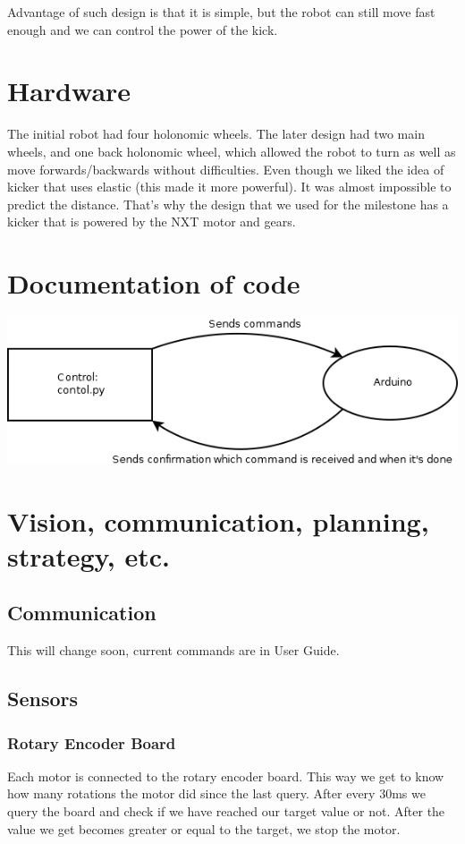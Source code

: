 \documentclass[12pt]{article}
\begin{document}
	Advantage of such design is that it is simple, but the robot can still move fast enough and we can control the power of the kick. 
 
  \section{Hardware}  
  \bigskip
  
  The initial robot had four holonomic wheels. The later design had two main wheels, and one back holonomic wheel, which allowed the robot to turn as well as move forwards/backwards without difficulties. 
	Even though we liked the idea of kicker that uses elastic (this made it more powerful). It was almost impossible to predict the distance. That's why the design that we used for the milestone has a kicker that is powered by the NXT motor and gears.
  \section{Documentation of code} 
  \bigskip
  
\includegraphics[scale=.7]{Diagram2}

\section{Vision, communication, planning, strategy, etc.}
	\subsection{Communication} 

		This will change soon, current commands are in User Guide.

	\subsection{Sensors} 
		\subsubsection{Rotary Encoder Board} 
			
			Each motor is connected to the rotary encoder board. This way we get to know how many rotations the motor did since the last query. After every 30ms we query the board and check if we have reached our target value or not. After the value we get becomes greater or equal to the target, we stop the motor.
 
\end{document}
